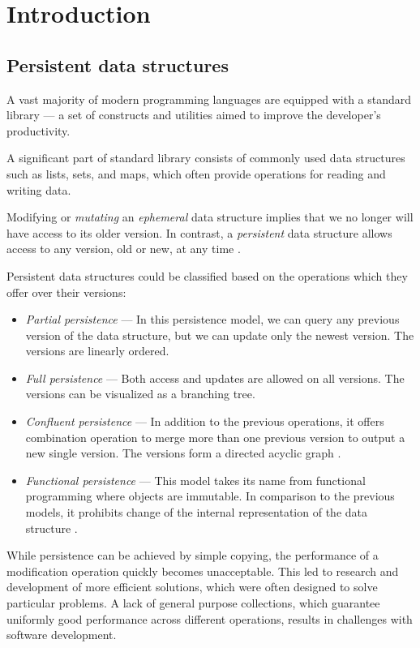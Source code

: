 \chapter{Introduction}

\section{Persistent data structures}

A vast majority of modern programming languages are equipped with a standard library --- a set of constructs and utilities aimed to improve the developer's productivity. 

A significant part of standard library consists of commonly used data structures such as lists, sets, and maps, which often provide operations for reading and writing data. 

Modifying or \emph{mutating} an \emph{ephemeral} data structure implies that we no longer will have access to its older version. In contrast, a \emph{persistent} data structure allows access to any version, old or new, at any time \cite{making-data-structures-persistent}. 

Persistent data structures could be classified based on the operations which they offer over their versions:
\begin{itemize}
    \item \textit{Partial persistence} --- In this persistence model, we can query any previous version of the data structure, but we can update only the newest version. The versions are linearly ordered. 
    \item \textit{Full persistence} --- Both access and updates are allowed on all versions. The versions can be visualized as a branching tree.
    \item \textit{Confluent persistence} --- In addition to the previous operations, it offers combination operation to merge more than one previous version to output a new single version. The versions form a directed acyclic graph \cite{fully-persistent-lists-with-catenation}.  
    \item \textit{Functional persistence} --- This model takes its name from functional programming where objects are immutable. In comparison to the previous models, it prohibits change of the internal representation of the data structure \cite{purely-functional-data-structures}. 
\end{itemize}

While persistence can be achieved by simple copying, the performance of a modification operation quickly becomes unacceptable. This led to research and development of more efficient solutions, which were often designed to solve particular problems. A lack of general purpose collections, which guarantee uniformly good performance across different operations, results in challenges with software development. 

